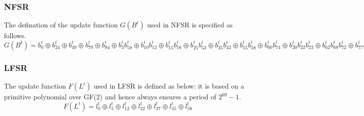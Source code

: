 \subsubsection*{NFSR}
The defination of the update function $G(B^t)$ used in NFSR is specified as follows.
\\[2mm]
$
	G(B^t)= b^t_{0} \oplus  b^t_{24} \oplus  b^t_{49} \oplus  b^t_{79} \oplus  b^t_{84} \oplus  b^t_{3}b^t_{59} \oplus  b^t_{10}b^t_{12} \oplus  b^t_{15}b^t_{16} \oplus  b^t_{25}b^t_{53} \oplus  b^t_{35}b^t_{42} \oplus  b^t_{55}b^t_{58} \oplus  b^t_{60}b^t_{74} \oplus  b^t_{20}b^t_{22}b^t_{23} \oplus  b^t_{62}b^t_{68}b^t_{72} \oplus  b^t_{77}b^t_{80}b^t_{81}b^t_{83}
$
\\[2mm]
\subsubsection*{LFSR}
The update function $F(L^t)$ used in LFSR is defined as below: it is based on a
primitive polynomial over GF(2) and hence always ensures a period of $2^{69} - 1$.
\begin{equation}
	F(L^t) = l^t_{0} \oplus  l^t_{5} \oplus  l^t_{12} \oplus  l^t_{22} \oplus  l^t_{37} \oplus  l^t_{45} \oplus  l^t_{58}
\end{equation}

